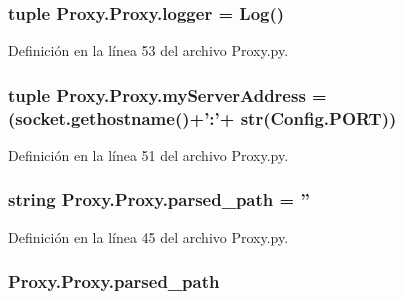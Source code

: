 \hypertarget{class_proxy_1_1_proxy_a1d1c37c018e4b8145ef91a90784e2652}{
\subsubsection[{logger}]{\setlength{\rightskip}{0pt plus 5cm}tuple Proxy.\-Proxy.\-logger = {\bf Log}()\hspace{0.3cm}{\ttfamily [static]}}}\label{class_proxy_1_1_proxy_a1d1c37c018e4b8145ef91a90784e2652}


Definición en la línea 53 del archivo Proxy.\-py.

\hypertarget{class_proxy_1_1_proxy_a062b5fa9885896b6c1e05542794d28d8}{
\subsubsection[{my\-Server\-Address}]{\setlength{\rightskip}{0pt plus 5cm}tuple Proxy.\-Proxy.\-my\-Server\-Address = (socket.\-gethostname()+'\-:'+ str({\bf Config.\-P\-O\-R\-T}))\hspace{0.3cm}{\ttfamily [static]}}}\label{class_proxy_1_1_proxy_a062b5fa9885896b6c1e05542794d28d8}


Definición en la línea 51 del archivo Proxy.\-py.

\hypertarget{class_proxy_1_1_proxy_a7e88511cbc9940770aa5b62a2d05f0ff}{
\subsubsection[{parsed\-\_\-path}]{\setlength{\rightskip}{0pt plus 5cm}string Proxy.\-Proxy.\-parsed\-\_\-path = ''\hspace{0.3cm}{\ttfamily [static]}}}\label{class_proxy_1_1_proxy_a7e88511cbc9940770aa5b62a2d05f0ff}


Definición en la línea 45 del archivo Proxy.\-py.

\hypertarget{class_proxy_1_1_proxy_a7ff07ccd879fa486f5a51243ba65ca97}{
\subsubsection[{parsed\-\_\-path}]{\setlength{\rightskip}{0pt plus 5cm}Proxy.\-Proxy.\-parsed\-\_\-path}}\label{class_proxy_1_1_proxy_a7ff07ccd879fa486f5a51243ba65ca97}



